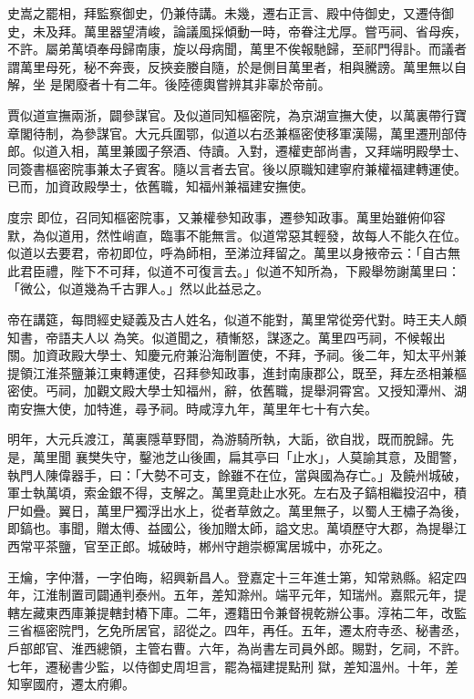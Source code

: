 \begin{pinyinscope}
 史嵩之罷相，拜監察御史，仍兼侍講。未幾，遷右正言、殿中侍御史，又遷侍御史，未及拜。萬里器望清峻，論議風採傾動一時，帝眷注尤厚。嘗丐祠、省母疾，不許。屬弟萬頃奉母歸南康，旋以母病聞，萬里不俟報馳歸，至祁門得訃。而議者謂萬里母死，秘不奔喪，反挾妾媵自隨，於是側目萬里者，相與騰謗。萬里無以自解，坐
 是閑廢者十有二年。後陸德輿嘗辨其非辜於帝前。



 賈似道宣撫兩浙，闢參謀官。及似道同知樞密院，為京湖宣撫大使，以萬裏帶行寶章閣待制，為參謀官。大元兵圍鄂，似道以右丞兼樞密使移軍漢陽，萬里遷刑部侍郎。似道入相，萬里兼國子祭酒、侍讀。入對，遷權吏部尚書，又拜端明殿學士、同簽書樞密院事兼太子賓客。隨以言者去官。後以原職知建寧府兼權福建轉運使。已而，加資政殿學士，依舊職，知福州兼福建安撫使。



 度宗
 即位，召同知樞密院事，又兼權參知政事，遷參知政事。萬里始雖俯仰容默，為似道用，然性峭直，臨事不能無言。似道常惡其輕發，故每人不能久在位。似道以去要君，帝初即位，呼為師相，至涕泣拜留之。萬里以身掖帝云：「自古無此君臣禮，陛下不可拜，似道不可復言去。」似道不知所為，下殿舉笏謝萬里曰：「微公，似道幾為千古罪人。」然以此益忌之。



 帝在講筵，每問經史疑義及古人姓名，似道不能對，萬里常從旁代對。時王夫人頗知書，帝語夫人以
 為笑。似道聞之，積慚怒，謀逐之。萬里四丐祠，不候報出關。加資政殿大學士、知慶元府兼沿海制置使，不拜，予祠。後二年，知太平州兼提領江淮茶鹽兼江東轉運使，召拜參知政事，進封南康郡公，既至，拜左丞相兼樞密使。丐祠，加觀文殿大學士知福州，辭，依舊職，提舉洞霄宮。又授知潭州、湖南安撫大使，加特進，尋予祠。時咸淳九年，萬里年七十有六矣。



 明年，大元兵渡江，萬裏隱草野間，為游騎所執，大詬，欲自戕，既而脫歸。先是，萬里聞
 襄樊失守，鑿池芝山後圃，扁其亭曰「止水」，人莫諭其意，及聞警，執門人陳偉器手，曰：「大勢不可支，餘雖不在位，當與國為存亡。」及饒州城破，軍士執萬頃，索金銀不得，支解之。萬里竟赴止水死。左右及子鎬相繼投沼中，積尸如疊。翼日，萬里尸獨浮出水上，從者草斂之。萬里無子，以蜀人王橚子為後，即鎬也。事聞，贈太傅、益國公，後加贈太師，謚文忠。萬頃歷守大郡，為提舉江西常平茶鹽，官至正郎。城破時，郴州守趙崇榞寓居城中，亦死之。



 王爚，字仲潛，一字伯晦，紹興新昌人。登嘉定十三年進士第，知常熟縣。紹定四年，江淮制置司闢通判泰州。五年，差知滁州。端平元年，知瑞州。嘉熙元年，提轄左藏東西庫兼提轄封樁下庫。二年，遷籍田令兼督視乾辦公事。淳祐二年，改監三省樞密院門，乞免所居官，詔從之。四年，再任。五年，遷太府寺丞、秘書丞，戶部郎官、淮西總領，主管右曹。六年，為尚書左司員外郎。賜對，乞祠，不許。七年，遷秘書少監，以侍御史周坦言，罷為福建提點刑
 獄，差知溫州。十年，差知寧國府，遷太府卿。




\end{pinyinscope}
